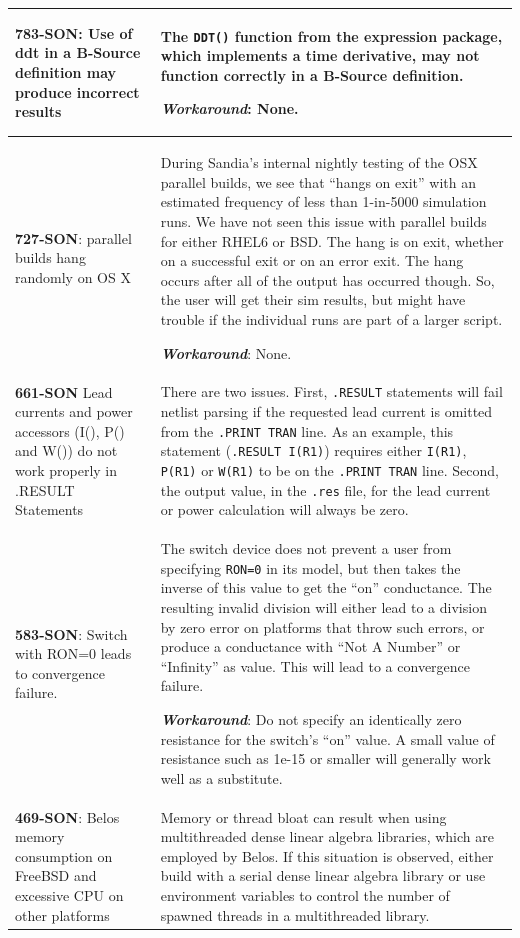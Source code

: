 {\begin{longtable}[h] {>{\raggedright\small}m{2in}|>{\raggedright\let\\\tabularnewline\small}m{3.5in}}
\textbf{783-SON}: Use of ddt in a B-Source definition may produce incorrect
results & The \texttt{DDT()} function from the \Xyce{} expression
package, which implements a time derivative, may not function
correctly in a B-Source definition.

\textbf{\textit{Workaround}}: None. \\ \hline

\textbf{727-SON}: \Xyce{} parallel builds hang randomly on OS X & During
Sandia's internal nightly testing of the OSX parallel builds, we see
that \Xyce{} ``hangs on exit'' with an estimated frequency of less
than 1-in-5000 simulation runs.  We have not seen this issue with
parallel builds for either RHEL6 or BSD.  The hang is on exit, whether
on a successful exit or on an error exit.  The hang occurs after all
of the \Xyce{} output has occurred though.  So, the user will get
their sim results, but might have trouble if the individual \Xyce{}
runs are part of a larger script.

\textbf{\textit{Workaround}}: None. \\ \hline

\textbf{661-SON} Lead currents and power accessors (I(), P() and W()) do
not work properly in .RESULT Statements & There are two issues.
First, \texttt{.RESULT} statements will fail netlist parsing if the
requested lead current is omitted from the \texttt{.PRINT TRAN}
line.  As an example, this statement (\texttt{.RESULT I(R1)}) requires
either \texttt{I(R1)},
\texttt{P(R1)} or \texttt{W(R1)} to be on the \texttt{.PRINT TRAN} line.
Second, the output value, in the \texttt{.res} file, for the lead
current or power calculation will always be zero.
\\ \hline

\textbf{583-SON}: Switch with RON=0 leads to convergence failure. &
The switch device does not prevent a user from
specifying \texttt{RON=0} in its model, but then takes the inverse of
this value to get the ``on'' conductance.  The resulting invalid
division will either lead to a division by zero error on platforms
that throw such errors, or produce a conductance with ``Not A Number''
or ``Infinity'' as value.  This will lead to a convergence failure.

\textbf{\textit{Workaround}}: Do not specify an identically zero resistance
for the switch's ``on'' value.  A small value of resistance such as
1e-15 or smaller will generally work well as a substitute. \\ \hline


\textbf{469-SON}: Belos memory consumption on FreeBSD and excessive CPU on other
platforms & Memory or thread bloat can result when using multithreaded
dense linear algebra libraries, which are employed by Belos.  If this
situation is observed, either build
\Xyce{} with a serial dense linear algebra library or use environment variables
to control the number of spawned threads in a multithreaded library.
\\ \hline



\end{longtable}}
